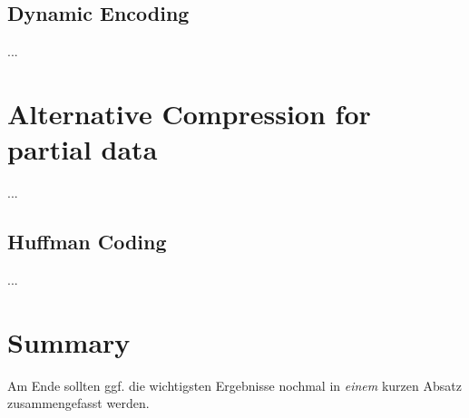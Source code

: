 \subsection{Dynamic Encoding}
...

\section{Alternative Compression for partial data}
\label{ch:Conceptual Design:sec:Alternative Encoding}
...
\subsection{Huffman Coding}
...
\section{Summary}
\label{ch:Conceptual Design:sec:Summary}

Am Ende sollten ggf. die wichtigsten Ergebnisse nochmal in \emph{einem}
kurzen Absatz zusammengefasst werden.

